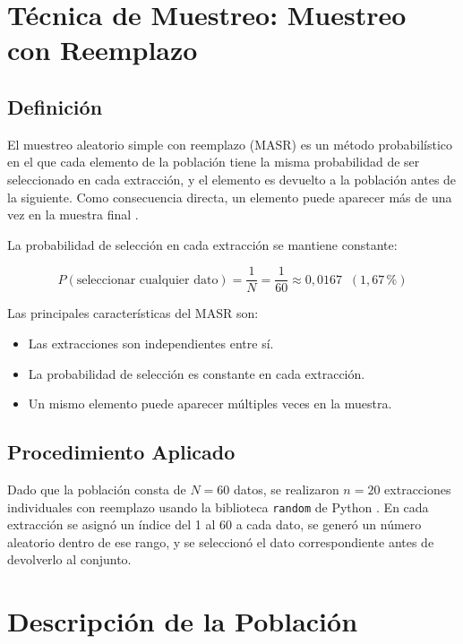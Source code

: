 \documentclass[12pt,a4paper]{article}
\begin{document}
\section{Técnica de Muestreo: Muestreo con Reemplazo}

\subsection{Definición}

El muestreo aleatorio simple con reemplazo (MASR) es un método probabilístico en el
que cada elemento de la población tiene la misma probabilidad de ser seleccionado en cada
extracción, y el elemento es devuelto a la población antes de la siguiente. Como consecuencia
directa, un elemento puede aparecer más de una vez en la muestra final \cite{scheaffer2006}.

La probabilidad de selección en cada extracción se mantiene constante:

\begin{equation}
  P(\text{seleccionar cualquier dato}) = \frac{1}{N} = \frac{1}{60} \approx 0{,}0167 \;\; (1{,}67\,\%)
\end{equation}

Las principales características del MASR son:
\begin{itemize}
  \item Las extracciones son independientes entre sí.
  \item La probabilidad de selección es constante en cada extracción.
  \item Un mismo elemento puede aparecer múltiples veces en la muestra.
\end{itemize}

\subsection{Procedimiento Aplicado}

Dado que la población consta de $N = 60$ datos, se realizaron $n = 20$ extracciones individuales
con reemplazo usando la biblioteca \texttt{random} de Python \cite{python_random}. En cada extracción se asignó un
índice del 1 al 60 a cada dato, se generó un número aleatorio dentro de ese rango, y se
seleccionó el dato correspondiente antes de devolverlo al conjunto.

\section{Descripción de la Población}
\end{document}
